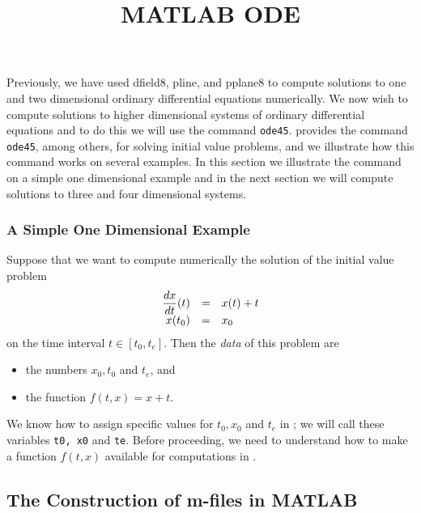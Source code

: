 \documentclass{ximera}
\title{MATLAB ODE}
\begin{document}
\begin{abstract}
\end{abstract}
\maketitle

\label{S:ode45}

Previously, we have used {\sf dfield8}, {\sf pline}, and {\sf pplane8}
to compute solutions to one and two dimensional ordinary differential
equations numerically.  We now wish to compute solutions to higher dimensional
systems of ordinary differential equations and to do this we will use the 
\Matlab command {\tt ode45}.  \Matlab provides the 
command {\tt ode45}, among others, for solving initial value problems, and we 
illustrate how this command works on several examples.  In this section we 
illustrate the command on a simple one dimensional example and in the next
section we will compute solutions to three and four dimensional systems.

\subsubsection*{A Simple One Dimensional Example}

Suppose that we want to compute numerically the solution of the initial value 
problem
\arraystart
\begin{equation}   \label{eq:fexam}
\begin{array}{rcl}
\displaystyle \frac{dx}{dt}(t) & = & x(t)+t \\
x(t_0) & = & x_0
\end{array}
\end{equation}
\arrayfinish
on the time interval $t\in [t_0,t_e]$.  Then the {\em data\/} of this 
problem are 
\begin{itemize}
\item the numbers $x_0,t_0$ and $t_e$, and 
\item the function $f(t,x)=x+t$.  
\end{itemize}
We know how to assign specific values for $t_0,x_0$ and $t_e$ in \Matlabp;
we will call these variables {\tt t0, x0} and {\tt te}.  Before proceeding, 
we need to understand how to make a function $f(t,x)$ available for 
computations in \Matlabp.

\subsection*{The Construction of m-files in MATLAB}
\end{document}
